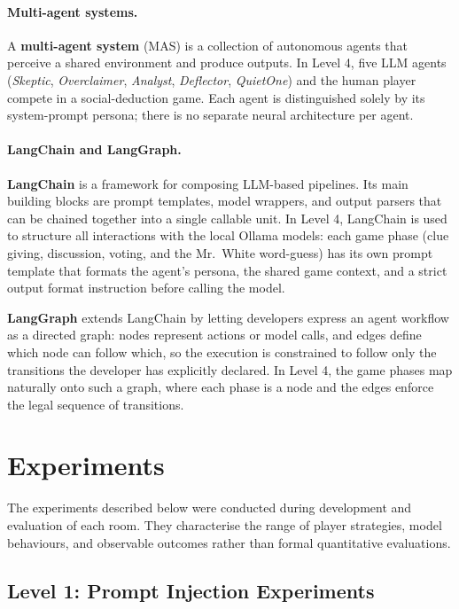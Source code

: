 \documentclass[11pt,a4paper]{article}
\begin{document}
\paragraph{Multi-agent systems.}
A \textbf{multi-agent system} (MAS) is a collection of autonomous agents that
perceive a shared environment and produce outputs. In Level 4, five LLM agents
(\textit{Skeptic}, \textit{Overclaimer}, \textit{Analyst}, \textit{Deflector},
\textit{QuietOne}) and the human player compete in a social-deduction game.
Each agent is distinguished solely by its system-prompt persona; there is no
separate neural architecture per agent.

\paragraph{LangChain and LangGraph.}
\textbf{LangChain} is a framework for composing LLM-based pipelines. Its main
building blocks are prompt templates, model wrappers, and output parsers that can
be chained together into a single callable unit. In Level 4, LangChain is used to
structure all interactions with the local Ollama models: each game phase (clue
giving, discussion, voting, and the Mr.\ White word-guess) has its own prompt
template that formats the agent's persona, the shared game context, and a strict
output format instruction before calling the model.

\textbf{LangGraph} extends LangChain by letting developers express an agent
workflow as a directed graph: nodes represent actions or model calls, and edges
define which node can follow which, so the execution is constrained to follow only
the transitions the developer has explicitly declared. In Level 4, the game phases map naturally onto such a graph, where each phase is a node and
the edges enforce the legal sequence of transitions.
\section{Experiments}

The experiments described below were conducted during development and evaluation of
each room. They characterise the range of player strategies, model behaviours, and
observable outcomes rather than formal quantitative evaluations.

\subsection{Level 1: Prompt Injection Experiments}
\end{document}
